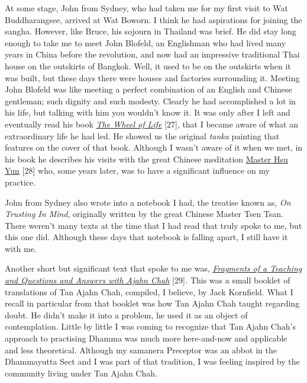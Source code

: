 At some stage, John from Sydney, who had taken me for my first visit to
Wat Buddharangsee, arrived at Wat Boworn. I think he had aspirations for
joining the sangha. However, like Bruce, his sojourn in Thailand was
brief. He did stay long enough to take me to meet John Blofeld, an
Englishman who had lived many years in China before the revolution, and
now had an impressive traditional Thai house on the outskirts of
Bangkok. Well, it used to be on the outskirts when it was built, but
these days there were houses and factories surrounding it. Meeting John
Blofeld was like meeting a perfect combination of an English and Chinese
gentleman; such dignity and such modesty. Clearly he had accomplished a
lot in his life, but talking with him you wouldn't know it. It was only
after I left and eventually read his book
\href{https://www.shambhala.com/the-wheel-of-life.html}{\emph{\underline{The
Wheel of Life}}} {[}27{]}, that I became aware of what an extraordinary
life he had led. He showed us the original \emph{tanka} painting that
features on the cover of that book. Although I wasn't aware of it when
we met, in his book he describes his visits with the great Chinese
meditation \href{https://www.emptycloud.net/}{\underline{Master Hsu
Yun}} {[}28{]} who, some years later, was to have a significant
influence on my practice.

John from Sydney also wrote into a notebook I had, the treatise known
as, \emph{On Trusting In Mind}, originally written by the great Chinese
Master Tsen Tsan. There weren't many texts at the time that I had read
that truly spoke to me, but this one did. Although these days that
notebook is falling apart, I still have it with me.

Another short but significant text that spoke to me was,
\href{https://forestsangha.org/teachings/books/the-collected-teachings-of-ajahn-chah-single-volume?language=English}{\emph{\underline{Fragments
of a Teaching and Questions and Answers with Ajahn Chah}}}
{[}29{]}\emph{.} This was a small booklet of translations of Tan Ajahn
Chah, compiled, I believe, by Jack Kornfield. What I recall in
particular from that booklet was how Tan Ajahn Chah taught regarding
doubt. He didn't make it into a problem, he used it as an object of
contemplation. Little by little I was coming to recognize that Tan Ajahn
Chah's approach to practising Dhamma was much more here-and-now and
applicable and less theoretical. Although my samanera Preceptor was an
abbot in the Dhammayutta Sect and I was part of that tradition, I was
feeling inspired by the community living under Tan Ajahn Chah.

